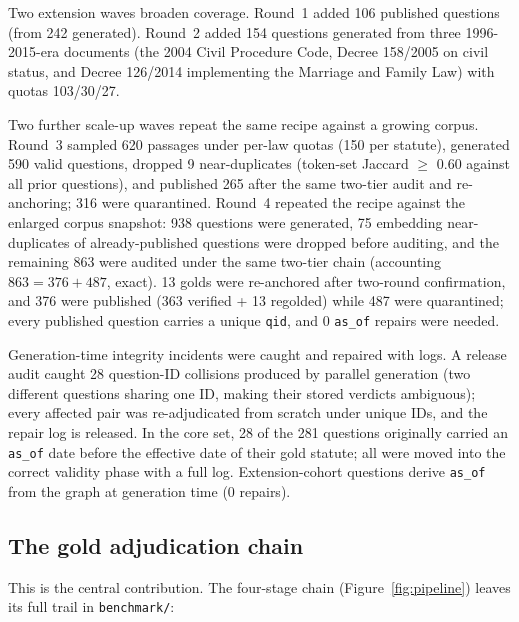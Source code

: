 \documentclass[10pt,a4paper,twocolumn]{article}
\newcommand{\code}[1]{\texttt{#1}}
\begin{document}
Two extension waves broaden coverage. Round~1 added 106 published questions (from 242 generated). Round~2 added 154 questions generated from three 1996-2015-era documents (the 2004 Civil Procedure Code, Decree 158/2005 on civil status, and Decree 126/2014 implementing the Marriage and Family Law) with quotas 103/30/27.

Two further scale-up waves repeat the same recipe against a growing corpus. Round~3 sampled 620 passages under per-law quotas (150 per statute), generated 590 valid questions, dropped 9 near-duplicates (token-set Jaccard $\ge$ 0.60 against all prior questions), and published 265 after the same two-tier audit and re-anchoring; 316 were quarantined. Round~4 repeated the recipe against the enlarged corpus snapshot: 938 questions were generated, 75 embedding near-duplicates of already-published questions were dropped before auditing, and the remaining 863 were audited under the same two-tier chain (accounting $863=376+487$, exact). 13 golds were re-anchored after two-round confirmation, and 376 were published (363 verified + 13 regolded) while 487 were quarantined; every published question carries a unique \code{qid}, and 0 \code{as\_of} repairs were needed.

Generation-time integrity incidents were caught and repaired with logs. A release audit caught 28 question-ID collisions produced by parallel generation (two different questions sharing one ID, making their stored verdicts ambiguous); every affected pair was re-adjudicated from scratch under unique IDs, and the repair log is released. In the core set, 28 of the 281 questions originally carried an \code{as\_of} date before the effective date of their gold statute; all were moved into the correct validity phase with a full log. Extension-cohort questions derive \code{as\_of} from the graph at generation time (0 repairs).

\subsection{The gold adjudication chain}

This is the central contribution. The four-stage chain (Figure~\ref{fig:pipeline}) leaves its full trail in \code{benchmark/}:
\end{document}
